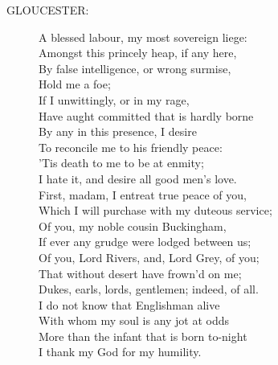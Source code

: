 \documentclass{article}
\begin{document}
\begin{description}
\item[GLOUCESTER:] 
\hspace{1pt}A blessed labour, my most sovereign liege:\\
\hspace{1pt}Amongst this princely heap, if any here,\\
\hspace{1pt}By false intelligence, or wrong surmise,\\
\hspace{1pt}Hold me a foe;\\
\hspace{1pt}If I unwittingly, or in my rage,\\
\hspace{1pt}Have aught committed that is hardly borne\\
\hspace{1pt}By any in this presence, I desire\\
\hspace{1pt}To reconcile me to his friendly peace:\\
\hspace{1pt}'Tis death to me to be at enmity;\\
\hspace{1pt}I hate it, and desire all good men's love.\\
\hspace{1pt}First, madam, I entreat true peace of you,\\
\hspace{1pt}Which I will purchase with my duteous service;\\
\hspace{1pt}Of you, my noble cousin Buckingham,\\
\hspace{1pt}If ever any grudge were lodged between us;\\
\hspace{1pt}Of you, Lord Rivers, and, Lord Grey, of you;\\
\hspace{1pt}That without desert have frown'd on me;\\
\hspace{1pt}Dukes, earls, lords, gentlemen; indeed, of all.\\
\hspace{1pt}I do not know that Englishman alive\\
\hspace{1pt}With whom my soul is any jot at odds\\
\hspace{1pt}More than the infant that is born to-night\\
\hspace{1pt}I thank my God for my humility.\\
\end{description}
\end{document}
